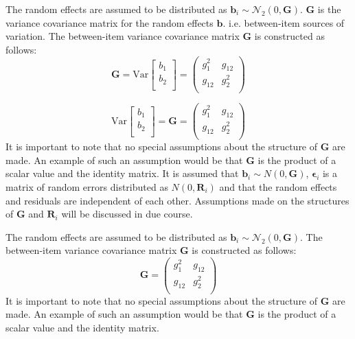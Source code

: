 \documentclass[12pt, a4paper]{report}
\theoremstyle{plain}
\theoremstyle{definition}
\theoremstyle{remark}
\begin{document}
The random effects are assumed to be distributed as $\boldsymbol{b}_i \sim \mathcal{N}_2(0,\boldsymbol{G})$. 	$\boldsymbol{G}$ is the variance covariance matrix for the random effects $\boldsymbol{b}$.
i.e. between-item sources of variation. The between-item variance covariance matrix $\boldsymbol{G}$ is constructed as follows:
\[ \boldsymbol{G} = \mbox{Var}  \left[
\begin{array}{c}
b_1   \\
b_2  \\
\end{array}
\right] =  \left(
\begin{array}{cc}
g^2_1  & g_{12} \\
g_{12} & g^2_2 \\
\end{array}
\right) \]



\[ \mbox{Var}  \left[
\begin{array}{c}
b_1   \\
b_2  \\
\end{array}
\right] =  \boldsymbol{G} =\left(
\begin{array}{cc}
g^2_1  & g_{12} \\
g_{12} & g^2_2 \\
\end{array}
\right) \]
It is important to note that no special assumptions about the structure of $\boldsymbol{G}$ are made. An example of such an assumption would be that $\boldsymbol{G}$ is the product of a scalar value and the identity matrix.
\bigskip
It is assumed that $\boldsymbol{b}_i \sim N(0,\boldsymbol{G})$,
$\boldsymbol{\epsilon}_i$ is a matrix of random errors distributed as $N(0,\boldsymbol{R}_i)$ and
that the random effects and residuals are independent of each other. Assumptions made on the structures of $\boldsymbol{G}$ and $\boldsymbol{R}_i$ will be discussed in due course.

\bigskip

The random effects are assumed to be distributed as $\boldsymbol{b}_i \sim \mathcal{N}_2(0,\boldsymbol{G})$. The between-item variance covariance matrix $\boldsymbol{G}$ is constructed as follows:
\[ \boldsymbol{G} =\left(
\begin{array}{cc}
g^2_1  & g_{12} \\
g_{12} & g^2_2 \\
\end{array}
\right) \]
It is important to note that no special assumptions about the structure of $\boldsymbol{G}$ are made. An example of such an assumption would be that $\boldsymbol{G}$ is the product of a scalar value and the identity matrix.
\end{document}
